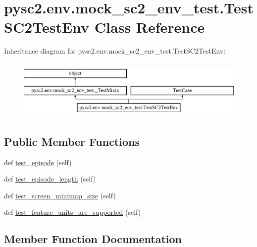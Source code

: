 \hypertarget{classpysc2_1_1env_1_1mock__sc2__env__test_1_1_test_s_c2_test_env}{}\section{pysc2.\+env.\+mock\+\_\+sc2\+\_\+env\+\_\+test.\+Test\+S\+C2\+Test\+Env Class Reference}
\label{classpysc2_1_1env_1_1mock__sc2__env__test_1_1_test_s_c2_test_env}
Inheritance diagram for pysc2.\+env.\+mock\+\_\+sc2\+\_\+env\+\_\+test.\+Test\+S\+C2\+Test\+Env\+:\begin{figure}[H]
\begin{center}
\leavevmode
\includegraphics[height=2.906574cm]{classpysc2_1_1env_1_1mock__sc2__env__test_1_1_test_s_c2_test_env}
\end{center}
\end{figure}
\subsection*{Public Member Functions}
\begin{DoxyCompactItemize}
\item 
def \mbox{\hyperlink{classpysc2_1_1env_1_1mock__sc2__env__test_1_1_test_s_c2_test_env_ad285bc2ff468325655c78a6000222e47}{test\+\_\+episode}} (self)
\item 
def \mbox{\hyperlink{classpysc2_1_1env_1_1mock__sc2__env__test_1_1_test_s_c2_test_env_a3fba2feb0d91797855af1055a7d3bddc}{test\+\_\+episode\+\_\+length}} (self)
\item 
def \mbox{\hyperlink{classpysc2_1_1env_1_1mock__sc2__env__test_1_1_test_s_c2_test_env_aac0359cf409eb577dc65434e8c4e632d}{test\+\_\+screen\+\_\+minimap\+\_\+size}} (self)
\item 
def \mbox{\hyperlink{classpysc2_1_1env_1_1mock__sc2__env__test_1_1_test_s_c2_test_env_a9f019526eaf1abf6164d07cc892a3e7d}{test\+\_\+feature\+\_\+units\+\_\+are\+\_\+supported}} (self)
\end{DoxyCompactItemize}


\subsection{Member Function Documentation}
\mbox{\label{classpysc2_1_1env_1_1mock__sc2__env__test_1_1_test_s_c2_test_env_ad285bc2ff468325655c78a6000222e47}} 
